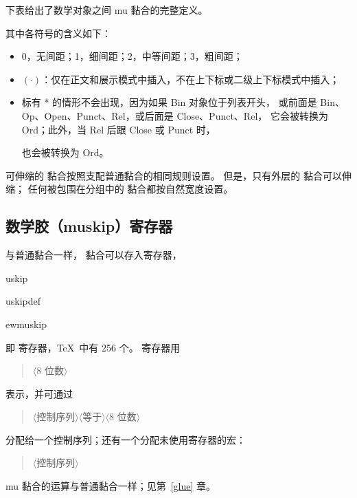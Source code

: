 \documentclass[a4paper]{rapport3}
\makeatletter
\def\gr#1{$\langle$#1$\rangle$}\def\key#1{{\tt#1}}
\def\alt{}\def\altt{}%
\newenvironment{disp}{\begin{quotation}}{\end{quotation}}
\def\cstoidx#1\par{\index{#1@\cs{#1}}}
\makeatother
\begin{document}
下表给出了数学对象之间 mu 黏合的完整定义。
\begin{disp}\leavevmode
\vbox{\offinterlineskip
    }
\end{disp}

其中各符号的含义如下：
\begin{itemize}\item 0，无间距；1，细间距；2，中等间距；3，粗间距；
\item $(\cdot)$：仅在正文和展示模式中插入，不在上下标或二级上下标模式中插入；
\item 标有 * 的情形不会出现，因为如果 Bin 对象位于列表开头，
或前面是 Bin、Op、Open、Punct、Rel，或后面是 Close、Punct、Rel，
它会被转换为 Ord；此外，当 Rel 后跟 Close 或 Punct 时，
\alt
也会被转换为 Ord。
\end{itemize}

可伸缩的  黏合按照支配普通黏合的相同规则设置。
但是，只有外层的  黏合可以伸缩；
任何被包围在分组中的  黏合都按自然宽度设置。

\subsection{数学胶（muskip）寄存器}

与普通黏合一样， 黏合可以存入寄存器，
\cstoidx muskip\par\cstoidx muskipdef\par\cstoidx newmuskip\par
即  寄存器，\TeX\ 中有 256 个。
寄存器用
\begin{disp}\gr{8 位数}\end{disp}
表示，并可通过
\begin{disp}\gr{控制序列}\gr{等于}\gr{8 位数}
\end{disp}
分配给一个控制序列；还有一个分配未使用寄存器的宏：
\begin{disp}\gr{控制序列}\end{disp}
mu 黏合的运算与普通黏合一样；见第~\ref{glue} 章。
\end{document}
